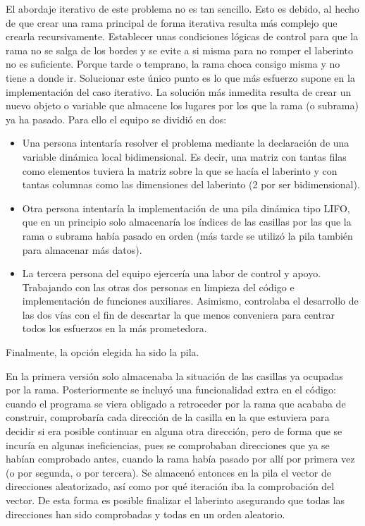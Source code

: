 \documentclass[12pt,a4paper]{article}
\begin{document}
El abordaje iterativo de este problema no es tan sencillo. Esto es debido, al hecho de que crear una rama principal de forma iterativa resulta más complejo que crearla recursivamente. Establecer unas condiciones lógicas de control para que la rama no se salga de los bordes y se evite a si misma para no romper el laberinto no es suficiente. Porque tarde o temprano, la rama choca consigo misma y no tiene a donde ir. Solucionar este único punto es lo que más esfuerzo supone en la implementación del caso iterativo. La solución más inmedita resulta de crear un nuevo objeto o variable que almacene los lugares por los que la rama (o subrama) ya ha pasado. Para ello el equipo se dividió en dos: 
\begin{itemize}
	\item Una persona intentaría resolver el problema mediante la declaración de una variable dinámica local bidimensional. Es decir, una matriz con tantas filas como elementos tuviera la matriz sobre la que se hacía el laberinto y con tantas columnas como las dimensiones del laberinto (2 por ser bidimensional). 
	\item Otra persona intentaría la implementación de una pila dinámica tipo LIFO, que en un principio solo almacenaría los índices de las casillas por las que la rama o subrama había pasado en orden (más tarde se utilizó la pila también para almacenar más datos). 
	\item La tercera persona del equipo ejercería una labor de control y apoyo. Trabajando con las otras dos personas en limpieza del código e implementación de funciones auxiliares. Asimismo, controlaba el desarrollo de las dos vías con el fin de descartar la que menos conveniera para centrar todos los esfuerzos en la más prometedora.
\end{itemize}

Finalmente, la opción elegida ha sido la pila.  

En la primera versión solo almacenaba la situación de las casillas ya ocupadas por la rama. Posteriormente se incluyó una funcionalidad extra en el código: cuando el programa se viera obligado a retroceder por la rama que acababa de construir, comprobaría cada dirección de la casilla en la que estuviera para decidir si era posible continuar en alguna otra dirección, pero de forma que se incuría en algunas ineficiencias, pues se comprobaban direcciones que ya se habían comprobado antes, cuando la rama había pasado por allí por primera vez (o por segunda, o por tercera). Se almacenó entonces en la pila el vector de direcciones aleatorizado, así como por qué iteración iba la comprobación del vector. De esta forma es posible finalizar el laberinto asegurando que todas las direcciones han sido comprobadas y todas en un orden aleatorio.
\end{document}
